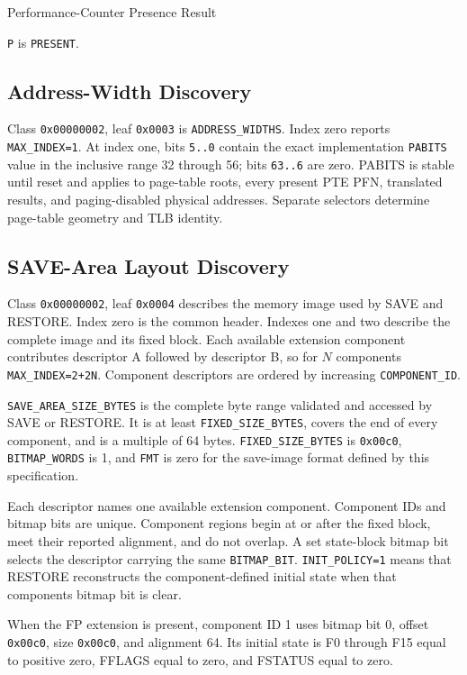 \begin{manuallistedformatdiagram}{Performance-Counter Presence Result}
\end{manuallistedformatdiagram}
{\small\texttt{P} is \texttt{PRESENT}.\par}

\subsection{Address-Width Discovery}
Class \texttt{0x00000002}, leaf \texttt{0x0003} is
\texttt{ADDRESS\_WIDTHS}. Index zero reports \texttt{MAX\_INDEX=1}. At index
one, bits \texttt{5..0} contain the exact implementation \texttt{PABITS}
value in the inclusive range 32 through 56; bits \texttt{63..6} are zero.
PABITS is stable until reset and applies to page-table roots, every present PTE
PFN, translated results, and paging-disabled physical addresses. Separate
selectors determine page-table geometry and TLB identity.

\subsection{SAVE-Area Layout Discovery}
Class \texttt{0x00000002}, leaf \texttt{0x0004} describes the memory image used by SAVE and RESTORE. Index zero is
the common header. Indexes one and two describe the complete image and its fixed block. Each available extension
component contributes descriptor A followed by descriptor B, so for $N$ components
\texttt{MAX\_INDEX=2+2N}. Component descriptors are ordered by increasing \texttt{COMPONENT\_ID}.



\texttt{SAVE\_AREA\_SIZE\_BYTES} is the complete byte range validated and accessed by SAVE or RESTORE. It is at
least \texttt{FIXED\_SIZE\_BYTES}, covers the end of every component, and is a multiple of 64 bytes.
\texttt{FIXED\_SIZE\_BYTES} is \texttt{0x00c0}, \texttt{BITMAP\_WORDS} is 1, and \texttt{FMT} is zero for the
save-image format defined by this specification.

Each descriptor names one available extension component. Component IDs and bitmap bits are unique. Component
regions begin at or after the fixed block, meet their reported alignment, and do not overlap. A set state-block
bitmap bit selects the descriptor carrying the same \texttt{BITMAP\_BIT}. \texttt{INIT\_POLICY=1} means that
RESTORE reconstructs the component-defined initial state when that component\textquotesingle{}s bitmap bit is clear.

When the FP extension is present, component ID 1 uses bitmap bit 0, offset \texttt{0x00c0}, size
\texttt{0x00c0}, and alignment 64. Its initial state is F0 through F15 equal to positive zero, FFLAGS equal to zero,
and FSTATUS equal to zero.
